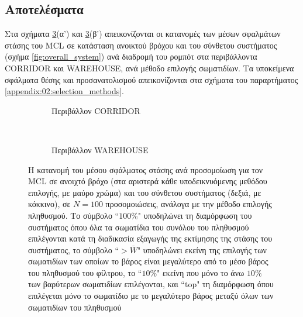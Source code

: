 \subsection{Αποτελέσματα}

Στα σχήματα \ref{fig:02_02_04:selections}(α') και
\ref{fig:02_02_04:selections}(β') απεικονίζονται οι κατανομές των μέσων
σφαλμάτων στάσης του MCL σε κατάσταση ανοικτού βρόχου και του σύνθετου
συστήματος (σχήμα \ref{fig:overall_system}) ανά διαδρομή του ρομπότ στα
περιβάλλοντα CORRIDOR και WAREHOUSE, ανά μέθοδο επιλογής σωματιδίων. Τα
υποκείμενα σφάλματα θέσης και προσανατολισμού απεικονίζονται στα σχήματα του
παραρτήματος \ref{appendix:02:selection_methods}.


\begin{figure}
  \vspace{2cm}
  \begin{subfigure}{\linewidth}
  \hspace{-1.25cm}
    
    \vspace{0.3cm}
    \caption{Περιβάλλον CORRIDOR}
    \label{fig:02_02_04:corridor_selections}
  \end{subfigure}\\
  \begin{subfigure}{\linewidth}\vspace{0.5cm}
    \hspace{-1.25cm}
    
    \vspace{0.3cm}
    \caption{Περιβάλλον WAREHOUSE}
    \label{fig:02_02_04:warehouse_selections}
  \end{subfigure}
\caption{\small Η κατανομή του μέσου σφάλματος στάσης ανά προσομοίωση για τον
         MCL σε ανοιχτό βρόχο (στα αριστερά κάθε υποδεικνυόμενης μεθόδου
         επιλογής, με μαύρο χρώμα) και του σύνθετου συστήματος (δεξιά, με
         κόκκινο), σε $N=100$ προσομοιώσεις, ανάλογα με την μέθοδο επιλογής
         πληθυσμού. Το σύμβολο ``$100\%$" υποδηλώνει τη διαμόρφωση του
         συστήματος όπου όλα τα σωματίδια του συνόλου του πληθυσμού επιλέγονται
         κατά τη διαδικασία εξαγωγής της εκτίμησης της στάσης του συστήματος,
         το σύμβολο ``$>\overline{W}$" υποδηλώνει εκείνη της επιλογής των
         σωματιδίων των οποίων το βάρος είναι μεγαλύτερο από το μέσο βάρος του
         πληθυσμού του φίλτρου, το ``$10\%$" εκείνη που μόνο το άνω $10\%$ των
         βαρύτερων σωματιδίων επιλέγονται, και ``top" τη διαμόρφωση όπου
         επιλέγεται μόνο το σωματίδιο με το μεγαλύτερο βάρος μεταξύ όλων των
         σωματιδίων του πληθυσμού}
\label{fig:02_02_04:selections}
\end{figure}

